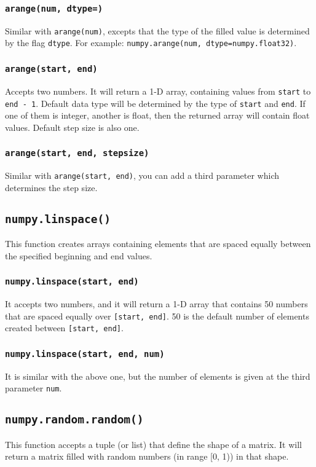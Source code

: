 \documentclass[12pt]{book}
\begin{document}
\subsubsection{\texttt{arange(num, dtype=)}}
\label{sec:org9cdc48c}
Similar with \texttt{arange(num)}, excepts that the type of the filled value is determined by the flag \texttt{dtype}. For example: \texttt{numpy.arange(num, dtype=numpy.float32)}.
\subsubsection{\texttt{arange(start, end)}}
\label{sec:org6ca0792}
Accepts two numbers. It will return a 1-D array, containing values from \texttt{start} to \texttt{end - 1}. Default data type will be determined by the type of \texttt{start} and \texttt{end}. If one of them is integer, another is float, then the returned array will contain float values. Default step size is also one.
\subsubsection{\texttt{arange(start, end, stepsize)}}
\label{sec:orgc5406a4}
Similar with \texttt{arange(start, end)}, you can add a third parameter which determines the step size.
\subsection{\texttt{numpy.linspace()}}
\label{sec:org0eb6857}
This function creates arrays containing elements that are spaced equally between the specified beginning and end values.
\subsubsection{\texttt{numpy.linspace(start, end)}}
\label{sec:org9210e48}
It accepts two numbers, and it will return a 1-D array that contains 50 numbers that are spaced equally over \texttt{[start, end]}. 50 is the default number of elements created between \texttt{[start, end]}.
\subsubsection{\texttt{numpy.linspace(start, end, num)}}
\label{sec:orgf149d97}
It is similar with the above one, but the number of elements is given at the third parameter \texttt{num}.
\subsection{\texttt{numpy.random.random()}}
\label{sec:org8ff276f}
This function accepts a tuple (or list) that define the shape of a matrix. It will return a matrix filled with random numbers (in range [0, 1)) in that shape.
\end{document}
